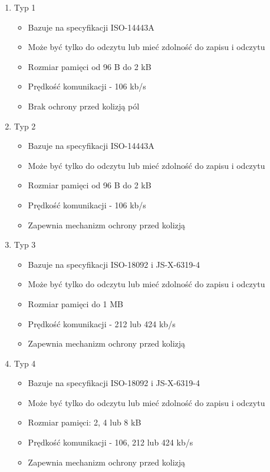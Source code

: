 \begin{enumerate}
	\item Typ 1
	\begin{itemize}
		\item Bazuje na specyfikacji ISO-14443A
		\item Może być tylko do odczytu lub mieć zdolność do zapisu i odczytu
		\item Rozmiar pamięci od 96 B do 2 kB
		\item Prędkość komunikacji - 106 kb/s
		\item Brak ochrony przed kolizją pól
	\end{itemize}
	
	\item Typ 2
	\begin{itemize}
		\item Bazuje na specyfikacji ISO-14443A
		\item Może być tylko do odczytu lub mieć zdolność do zapisu i odczytu
		\item Rozmiar pamięci od 96 B do 2 kB
		\item Prędkość komunikacji - 106 kb/s
		\item Zapewnia mechanizm ochrony przed kolizją
	\end{itemize}
	
	\item Typ 3
	\begin{itemize}
		\item Bazuje na specyfikacji ISO-18092 i JS-X-6319-4
		\item Może być tylko do odczytu lub mieć zdolność do zapisu i odczytu
		\item Rozmiar pamięci do 1 MB
		\item Prędkość komunikacji - 212 lub 424 kb/s
		\item Zapewnia mechanizm ochrony przed kolizją
	\end{itemize}
	\clearpage
	\item Typ 4
	\begin{itemize}
		\item Bazuje na specyfikacji ISO-18092 i JS-X-6319-4
		\item Może być tylko do odczytu lub mieć zdolność do zapisu i odczytu
		\item Rozmiar pamięci: 2, 4 lub 8 kB
		\item Prędkość komunikacji - 106, 212 lub 424 kb/s
		\item Zapewnia mechanizm ochrony przed kolizją
	\end{itemize}
	
\end{enumerate}


